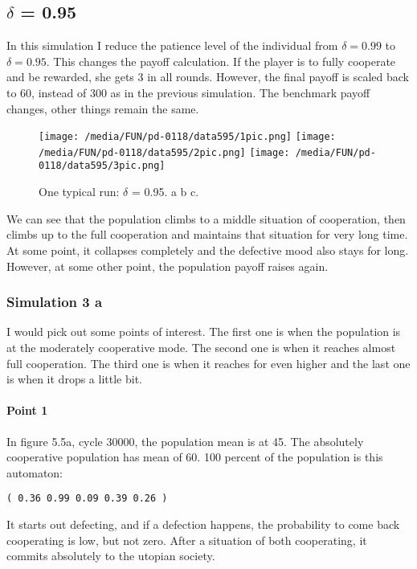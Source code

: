 \documentclass[12.5pt]{report}
\begin{document}
\subsection{$\delta$ = 0.95}
In this simulation I reduce the patience level of the individual from $\delta = 0.99$ to $\delta = 0.95$. This changes the payoff calculation. If the player is to fully cooperate and be rewarded, she gets 3 in all rounds. However, the final payoff is scaled back to 60, instead of 300 as in the previous simulation. The benchmark payoff changes, other things remain the same.

\begin{figure}[h!]
\texttt{[image: /media/FUN/pd-0118/data595/1pic.png]}
\texttt{[image: /media/FUN/pd-0118/data595/2pic.png]}
\texttt{[image: /media/FUN/pd-0118/data595/3pic.png]}
\caption{One typical run: $\delta$ = 0.95. a b c.}
\end{figure}

We can see that the population climbs to a middle situation of cooperation, then climbs up to the full cooperation and maintains that situation for very long time. At some point, it collapses completely and the defective mood also stays for long. However, at some other point, the population payoff raises again.\\

\subsubsection{Simulation 3 a}

I would pick out some points of interest. The first one is when the population is at the moderately cooperative mode. The second one is when it reaches almost full cooperation. The third one is when it reaches for even higher and the last one is when it drops a little bit.\\

\paragraph{Point 1}

In figure 5.5a, cycle 30000, the population mean is at 45. The absolutely cooperative population has mean of 60. 100 percent of the population is this automaton:

\begin{verbatim}
( 0.36 0.99 0.09 0.39 0.26 )
\end{verbatim}

It starts out defecting, and if a defection happens, the probability to come back cooperating is low, but not zero. After a situation of both cooperating, it commits absolutely to the utopian society.
\end{document}
